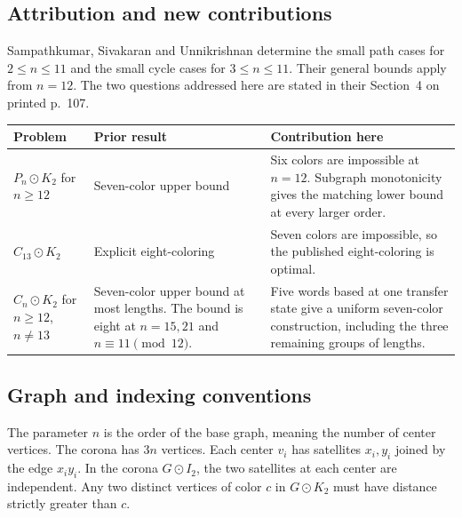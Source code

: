 \documentclass[11pt]{article}
\begin{document}
\subsection{Attribution and new contributions}
Sampathkumar, Sivakaran and Unnikrishnan \cite[Theorems~2.1 and 3.1]{ssu}
determine the small path cases for \(2\le n\le11\) and the small cycle
cases for \(3\le n\le11\). Their general bounds apply from \(n=12\).
The two questions addressed here are stated in their Section~4 on
printed p.~107.

\begin{center}\small
\begin{tabular}{@{}>{\raggedright\arraybackslash}p{.23\linewidth}
                   >{\raggedright\arraybackslash}p{.32\linewidth}
                   >{\raggedright\arraybackslash}p{.39\linewidth}@{}}
\toprule
Problem & Prior result & Contribution here\\
\midrule
\(P_n\odot K_2\) for \(n\ge12\)
  & Seven-color upper bound
  & Six colors are impossible at \(n=12\). Subgraph monotonicity gives
    the matching lower bound at every larger order.\\
\(C_{13}\odot K_2\)
  & Explicit eight-coloring
  & Seven colors are impossible, so the published eight-coloring is optimal.\\
\(C_n\odot K_2\) for \(n\ge12\), \(n\ne13\)
  & Seven-color upper bound at most lengths. The bound is eight at
    \(n=15,21\) and \(n\equiv11\pmod{12}\).
  & Five words based at one transfer state give a uniform seven-color
    construction, including the three remaining groups of lengths.\\
\bottomrule
\end{tabular}
\end{center}

\subsection{Graph and indexing conventions}
The parameter \(n\) is the order of the base graph, meaning the number of
center vertices. The corona has \(3n\) vertices. Each center \(v_i\) has
satellites \(x_i,y_i\) joined by the edge \(x_i y_i\). In the corona
\(G\odot I_2\), the two satellites at each center are independent.
Any two distinct vertices of color \(c\) in \(G\odot K_2\) must have
distance strictly greater than \(c\).
\end{document}

